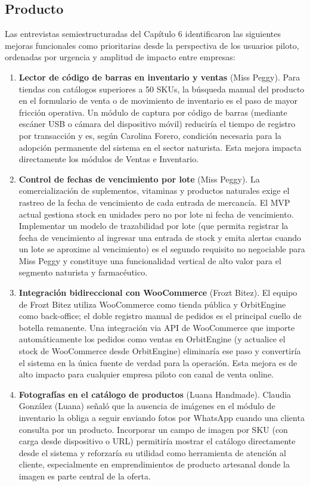 \subsection{Producto}\label{producto}

Las entrevistas semiestructuradas del Capítulo 6 identificaron las siguientes mejoras funcionales como prioritarias desde la perspectiva de los usuarios piloto, ordenadas por urgencia y amplitud de impacto entre empresas:

\begin{enumerate}
\def\labelenumi{\arabic{enumi}.}
\item
  \textbf{Lector de código de barras en inventario y ventas} (Miss Peggy). Para tiendas con catálogos superiores a 50 SKUs, la búsqueda manual del producto en el formulario de venta o de movimiento de inventario es el paso de mayor fricción operativa. Un módulo de captura por código de barras (mediante escáner USB o cámara del dispositivo móvil) reduciría el tiempo de registro por transacción y es, según Carolina Forero, condición necesaria para la adopción permanente del sistema en el sector naturista. Esta mejora impacta directamente los módulos de Ventas e Inventario.
\item
  \textbf{Control de fechas de vencimiento por lote} (Miss Peggy). La comercialización de suplementos, vitaminas y productos naturales exige el rastreo de la fecha de vencimiento de cada entrada de mercancía. El MVP actual gestiona stock en unidades pero no por lote ni fecha de vencimiento. Implementar un modelo de trazabilidad por lote (que permita registrar la fecha de vencimiento al ingresar una entrada de stock y emita alertas cuando un lote se aproxime al vencimiento) es el segundo requisito no negociable para Miss Peggy y constituye una funcionalidad vertical de alto valor para el segmento naturista y farmacéutico.
\item
  \textbf{Integración bidireccional con WooCommerce} (Frozt Bitez). El equipo de Frozt Bitez utiliza WooCommerce como tienda pública y OrbitEngine como back-office; el doble registro manual de pedidos es el principal cuello de botella remanente. Una integración via API de WooCommerce que importe automáticamente los pedidos como ventas en OrbitEngine (y actualice el stock de WooCommerce desde OrbitEngine) eliminaría ese paso y convertiría el sistema en la única fuente de verdad para la operación. Esta mejora es de alto impacto para cualquier empresa piloto con canal de venta online.
\item
  \textbf{Fotografías en el catálogo de productos} (Luana Handmade). Claudia González (Luana) señaló que la ausencia de imágenes en el módulo de inventario la obliga a seguir enviando fotos por WhatsApp cuando una clienta consulta por un producto. Incorporar un campo de imagen por SKU (con carga desde dispositivo o URL) permitiría mostrar el catálogo directamente desde el sistema y reforzaría su utilidad como herramienta de atención al cliente, especialmente en emprendimientos de producto artesanal donde la imagen es parte central de la oferta.
\end{enumerate}

